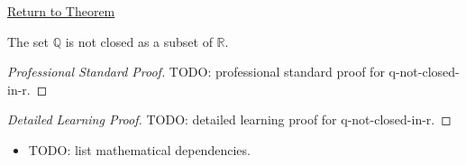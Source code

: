 \newpage
{}
\label{prf:q-not-closed-in-r}

\begin{remark*}[Return]
\hyperref[cor:q-not-closed-in-r]{Return to Theorem}
\end{remark*}

\begin{corollary*}
The set $\mathbb{Q}$ is not closed as a subset of $\mathbb{R}$.
\end{corollary*}

\begin{proof}[Professional Standard Proof]
\LRAProofBodyStart
TODO: professional standard proof for q-not-closed-in-r.
\end{proof}

\begin{proof}[Detailed Learning Proof]
\LRAProofBodyStart
TODO: detailed learning proof for q-not-closed-in-r.
\end{proof}

\begin{remark*}
\end{remark*}

\begin{dependencies}
\begin{itemize}
  \item TODO: list mathematical dependencies.
\end{itemize}
\end{dependencies}

\clearpage
